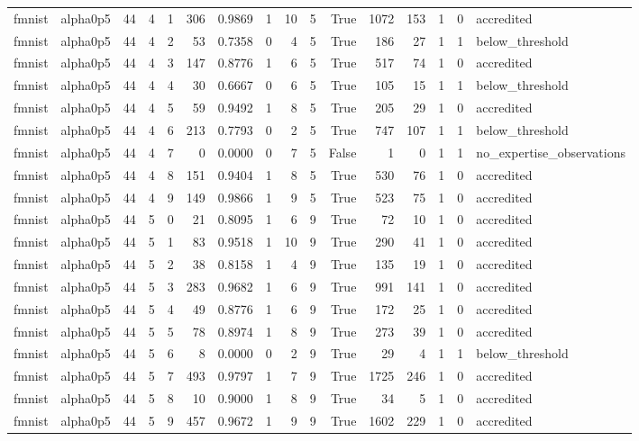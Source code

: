 \begin{tabular}{llrrrrrrrrrrrrrl}
fmnist & alpha0p5 & 44 & 4 & 1 & 306 & 0.9869 & 1 & 10 & 5 & True & 1072 & 153 & 1 & 0 & accredited \\
fmnist & alpha0p5 & 44 & 4 & 2 & 53 & 0.7358 & 0 & 4 & 5 & True & 186 & 27 & 1 & 1 & below\_threshold \\
fmnist & alpha0p5 & 44 & 4 & 3 & 147 & 0.8776 & 1 & 6 & 5 & True & 517 & 74 & 1 & 0 & accredited \\
fmnist & alpha0p5 & 44 & 4 & 4 & 30 & 0.6667 & 0 & 6 & 5 & True & 105 & 15 & 1 & 1 & below\_threshold \\
fmnist & alpha0p5 & 44 & 4 & 5 & 59 & 0.9492 & 1 & 8 & 5 & True & 205 & 29 & 1 & 0 & accredited \\
fmnist & alpha0p5 & 44 & 4 & 6 & 213 & 0.7793 & 0 & 2 & 5 & True & 747 & 107 & 1 & 1 & below\_threshold \\
fmnist & alpha0p5 & 44 & 4 & 7 & 0 & 0.0000 & 0 & 7 & 5 & False & 1 & 0 & 1 & 1 & no\_expertise\_observations \\
fmnist & alpha0p5 & 44 & 4 & 8 & 151 & 0.9404 & 1 & 8 & 5 & True & 530 & 76 & 1 & 0 & accredited \\
fmnist & alpha0p5 & 44 & 4 & 9 & 149 & 0.9866 & 1 & 9 & 5 & True & 523 & 75 & 1 & 0 & accredited \\
fmnist & alpha0p5 & 44 & 5 & 0 & 21 & 0.8095 & 1 & 6 & 9 & True & 72 & 10 & 1 & 0 & accredited \\
fmnist & alpha0p5 & 44 & 5 & 1 & 83 & 0.9518 & 1 & 10 & 9 & True & 290 & 41 & 1 & 0 & accredited \\
fmnist & alpha0p5 & 44 & 5 & 2 & 38 & 0.8158 & 1 & 4 & 9 & True & 135 & 19 & 1 & 0 & accredited \\
fmnist & alpha0p5 & 44 & 5 & 3 & 283 & 0.9682 & 1 & 6 & 9 & True & 991 & 141 & 1 & 0 & accredited \\
fmnist & alpha0p5 & 44 & 5 & 4 & 49 & 0.8776 & 1 & 6 & 9 & True & 172 & 25 & 1 & 0 & accredited \\
fmnist & alpha0p5 & 44 & 5 & 5 & 78 & 0.8974 & 1 & 8 & 9 & True & 273 & 39 & 1 & 0 & accredited \\
fmnist & alpha0p5 & 44 & 5 & 6 & 8 & 0.0000 & 0 & 2 & 9 & True & 29 & 4 & 1 & 1 & below\_threshold \\
fmnist & alpha0p5 & 44 & 5 & 7 & 493 & 0.9797 & 1 & 7 & 9 & True & 1725 & 246 & 1 & 0 & accredited \\
fmnist & alpha0p5 & 44 & 5 & 8 & 10 & 0.9000 & 1 & 8 & 9 & True & 34 & 5 & 1 & 0 & accredited \\
fmnist & alpha0p5 & 44 & 5 & 9 & 457 & 0.9672 & 1 & 9 & 9 & True & 1602 & 229 & 1 & 0 & accredited \\

\end{tabular}
